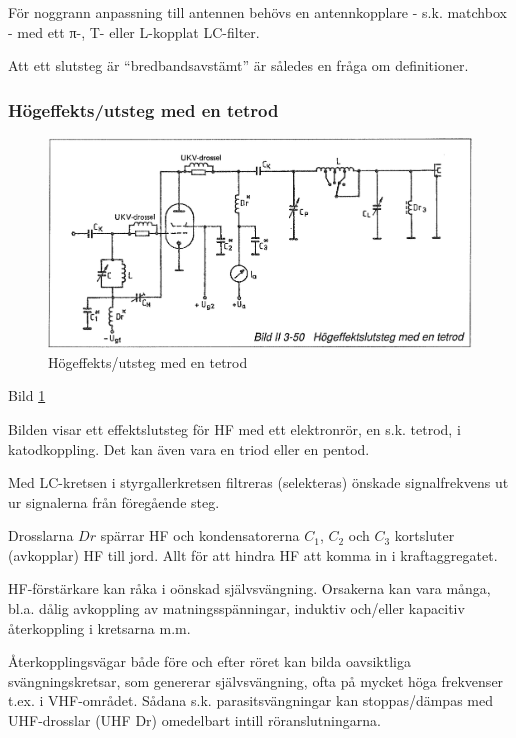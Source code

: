 För noggrann anpassning till antennen behövs en antennkopplare -
s.k. matchbox - med ett π-, T- eller L-kopplat LC-filter.

Att ett slutsteg är ``bredbandsavstämt'' är således en fråga om
definitioner.

\subsubsection{Högeffekts/utsteg med en tetrod}

\begin{figure}[h]
\begin{center}
\includegraphics[width=14cm]{images/bild_2_3-50}
\caption{Högeffekts/utsteg med en tetrod}
\label{fig:BildII3-50}
\end{center}
\end{figure}

Bild \ref{fig:BildII3-50}

Bilden visar ett effektslutsteg för HF med ett elektronrör, en
s.k. tetrod, i katodkoppling.  Det kan även vara en triod eller en
pentod.

Med LC-kretsen i styrgallerkretsen filtreras (selekteras) önskade
signalfrekvens ut ur signalerna från föregående steg.

Drosslarna \(Dr\) spärrar HF och kondensatorerna \(C_1\), \(C_2\) och
\(C_3\) kortsluter (avkopplar) HF till jord. Allt för att hindra HF
att komma in i kraftaggregatet.

HF-förstärkare kan råka i oönskad självsvängning. Orsakerna kan vara
många, bl.a.  dålig avkoppling av matningsspänningar, induktiv
och/eller kapacitiv återkoppling i kretsarna m.m.

Återkopplingsvägar både före och efter röret kan bilda oavsiktliga
svängningskretsar, som genererar självsvängning, ofta på mycket höga
frekvenser t.ex. i VHF-området. Sådana s.k. parasitsvängningar kan
stoppas/dämpas med UHF-drosslar (UHF Dr) omedelbart intill
röranslutningarna.

